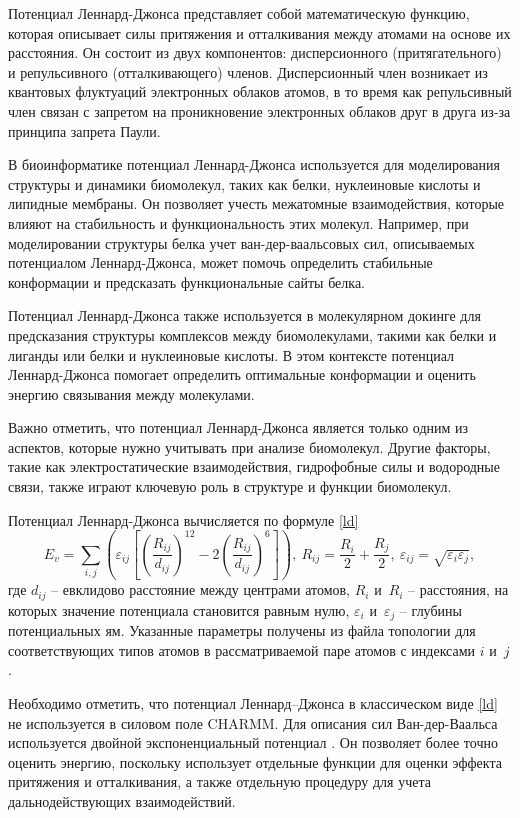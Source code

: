 Потенциал Леннард-Джонса представляет собой математическую функцию, которая описывает силы притяжения и отталкивания между атомами на основе их расстояния. Он состоит из двух компонентов: дисперсионного (притягательного) и репульсивного (отталкивающего) членов. Дисперсионный член возникает из квантовых флуктуаций электронных облаков атомов, в то время как репульсивный член связан с запретом на проникновение электронных облаков друг в друга из-за принципа запрета Паули.

В биоинформатике потенциал Леннард-Джонса используется для моделирования структуры и динамики биомолекул, таких как белки, нуклеиновые кислоты и липидные мембраны. Он позволяет учесть межатомные взаимодействия, которые влияют на стабильность и функциональность этих молекул. Например, при моделировании структуры белка учет ван-дер-ваальсовых сил, описываемых потенциалом Леннард-Джонса, может помочь определить стабильные конформации и предсказать функциональные сайты белка.

Потенциал Леннард-Джонса также используется в молекулярном докинге для предсказания структуры комплексов между биомолекулами, такими как белки и лиганды или белки и нуклеиновые кислоты. В этом контексте потенциал Леннард-Джонса помогает определить оптимальные конформации и оценить энергию связывания между молекулами.

Важно отметить, что потенциал Леннард-Джонса является только одним из аспектов, которые нужно учитывать при анализе биомолекул. Другие факторы, такие как электростатические взаимодействия, гидрофобные силы и водородные связи, также играют ключевую роль в структуре и функции биомолекул.

Потенциал Леннард-Джонса вычисляется по формуле \ref{ld}
\begin{equation}
	\displaystyle E_{v}=\sum _{i,j}\left(\varepsilon_{ij}\left[\left({\frac {R_{ij}}{d_{ij}}}\right)^{12}-2\left({\frac {R_{ij}}{d_{ij}}}\right)^{6}\right]\right), \ R_{ij} = \frac{R_{i}}{2} + \frac{R_{j}}{2}, \ \varepsilon_{ij} = \sqrt{\varepsilon_{i} \varepsilon_{j}},
	\label{ld}
\end{equation}
где $d_{ij}$ -- евклидово расстояние между центрами атомов, $R_{i}$ и~$R_{i}$ -- расстояния, на которых значение потенциала становится равным нулю, $\varepsilon_{i}$ и~$\varepsilon_{j}$ -- глубины потенциальных ям. Указанные параметры получены из файла топологии для соответствующих типов атомов в рассматриваемой паре атомов с индексами $i$ и~$j$.

Необходимо отметить, что потенциал Леннард--Джонса в классическом виде \ref{ld} не используется в силовом поле CHARMM. Для описания сил Ван-дер-Ваальса используется двойной экспоненциальный потенциал \cite{wu}. Он позволяет более точно оценить энергию, поскольку использует отдельные функции для оценки эффекта притяжения и отталкивания, а также отдельную процедуру для учета дальнодействующих взаимодействий.

